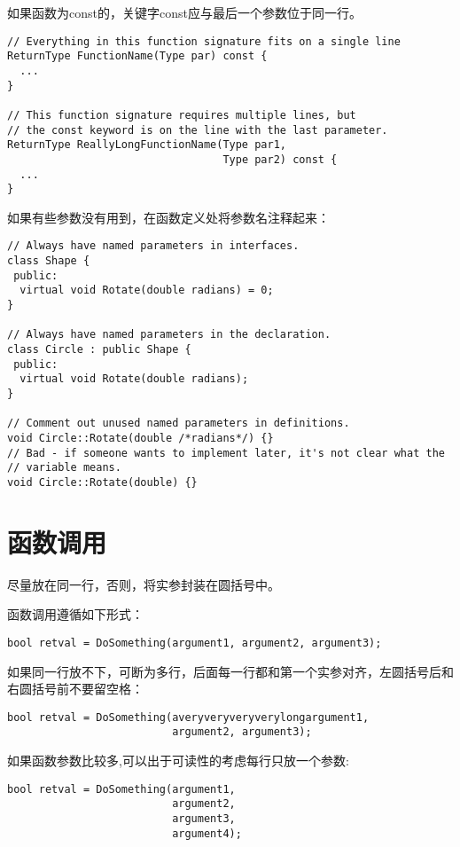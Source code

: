 如果函数为const的，关键字const应与最后一个参数位于同一行。
\begin{verbatim}
// Everything in this function signature fits on a single line
ReturnType FunctionName(Type par) const {
  ...
}

// This function signature requires multiple lines, but
// the const keyword is on the line with the last parameter.
ReturnType ReallyLongFunctionName(Type par1,
                                  Type par2) const {
  ...
}
\end{verbatim}

如果有些参数没有用到，在函数定义处将参数名注释起来：
\begin{verbatim}
// Always have named parameters in interfaces.
class Shape {
 public:
  virtual void Rotate(double radians) = 0;
}

// Always have named parameters in the declaration.
class Circle : public Shape {
 public:
  virtual void Rotate(double radians);
}

// Comment out unused named parameters in definitions.
void Circle::Rotate(double /*radians*/) {}
// Bad - if someone wants to implement later, it's not clear what the
// variable means.
void Circle::Rotate(double) {}
\end{verbatim}


\section{函数调用}
尽量放在同一行，否则，将实参封装在圆括号中。

函数调用遵循如下形式：
\begin{verbatim}
bool retval = DoSomething(argument1, argument2, argument3);
\end{verbatim}

如果同一行放不下，可断为多行，后面每一行都和第一个实参对齐，左圆括号后和右圆括号前不要留空格：
\begin{verbatim}
bool retval = DoSomething(averyveryveryverylongargument1,
                          argument2, argument3);
\end{verbatim}

如果函数参数比较多,可以出于可读性的考虑每行只放一个参数:
\begin{verbatim}
bool retval = DoSomething(argument1,
                          argument2,
                          argument3,
                          argument4);
\end{verbatim}

